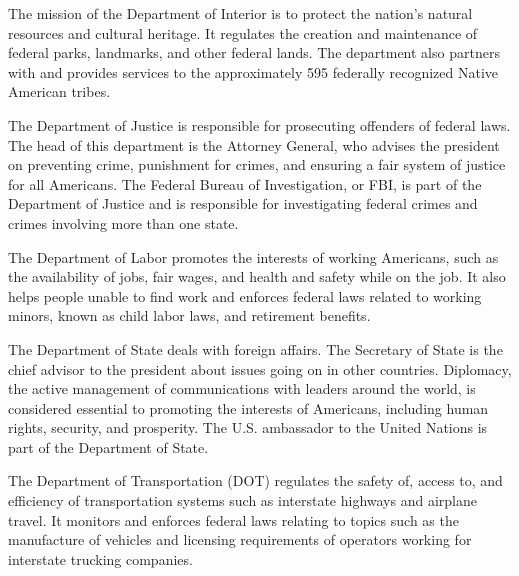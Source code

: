 \begin{definition}
    The mission of the Department of Interior is to protect the nation's natural
    resources and cultural heritage. It regulates the creation and maintenance
    of federal parks, landmarks, and other federal lands. The department also
    partners with and provides services to the approximately 595 federally
    recognized Native American tribes.
\end{definition}

\begin{definition}
    The Department of Justice is responsible for prosecuting offenders of
    federal laws. The head of this department is the Attorney General, who
    advises the president on preventing crime, punishment for crimes, and
    ensuring a fair system of justice for all Americans. The Federal Bureau of
    Investigation, or FBI, is part of the Department of Justice and is
    responsible for investigating federal crimes and crimes involving more than
    one state.
\end{definition}

\begin{definition}
    The Department of Labor promotes the interests of working Americans, such as
    the availability of jobs, fair wages, and health and safety while on the
    job. It also helps people unable to find work and enforces federal laws
    related to working minors, known as child labor laws, and retirement
    benefits.
\end{definition}

\begin{definition}
    The Department of State deals with foreign affairs. The Secretary of State
    is the chief advisor to the president about issues going on in other
    countries. Diplomacy, the active management of communications with leaders
    around the world, is considered essential to promoting the interests of
    Americans, including human rights, security, and prosperity. The U.S.
    ambassador to the United Nations is part of the Department of State.
\end{definition}

\begin{definition}
    The Department of Transportation (DOT) regulates the safety of, access to,
    and efficiency of transportation systems such as interstate highways and
    airplane travel. It monitors and enforces federal laws relating to topics
    such as the manufacture of vehicles and licensing requirements of operators
    working for interstate trucking companies.
\end{definition}

